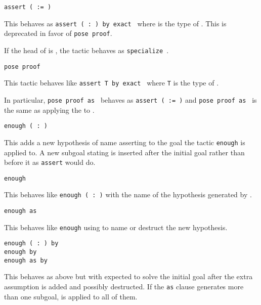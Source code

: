 \begin{coq_example*}
\begin{Variants}
\item{\tt assert ( {\ident} := {\term} )}

  This behaves as {\tt assert ({\ident} :\ {\type}) by exact {\term}}
  where {\type} is the type of {\term}. This is deprecated in favor of
  {\tt pose proof}.

  If the head of {\term} is {\ident}, the tactic behaves as
  {\tt specialize \term}.

  \ErrMsg {}

\item \texttt{pose proof {\term} }

  This tactic behaves like \texttt{assert T  by
  exact {\term}} where \texttt{T} is the type of {\term}.

  In particular, \texttt{pose proof {\term} as {\ident}} behaves as
  \texttt{assert ({\ident} := {\term})} and \texttt{pose proof {\term}
    as {\intropattern}} is the same as applying
  the {\intropattern} to {\term}.

\item \texttt{enough ({\ident} :\ {\form})}

  This adds a new hypothesis of name {\ident} asserting {\form} to the
  goal the tactic \texttt{enough} is applied to. A new subgoal stating
  \texttt{\form} is inserted after the initial goal rather than before
  it as \texttt{assert} would do.

\item \texttt{enough {\form}}

  This behaves like \texttt{enough ({\ident} :\ {\form})} with the name
  {\ident} of the hypothesis generated by {\Coq}.

\item \texttt{enough {\form} as {\intropattern}}

  This behaves like \texttt{enough} {\form} using {\intropattern} to
  name or destruct the new hypothesis.

\item \texttt{enough ({\ident} :\ {\form}) by {\tac}}\\
 \texttt{enough {\form} by {\tac}}\\
 \texttt{enough {\form} as {\intropattern} by {\tac}}

  This behaves as above but with {\tac} expected to solve the initial
  goal after the extra assumption {\form} is added and possibly
  destructed. If the \texttt{as} {\intropattern} clause generates more
  than one subgoal, {\tac} is applied to all of them.


\end{Variants}
\end{coq_example*}
